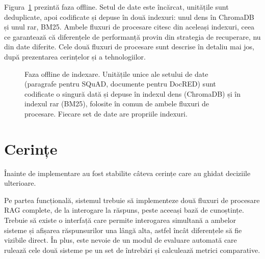 Figura~\ref{fig:offline} prezintă faza offline. Setul de date este încărcat, unitățile sunt deduplicate, apoi codificate și depuse în două indexuri: unul dens în ChromaDB și unul rar, BM25. Ambele fluxuri de procesare citesc din aceleași indexuri, ceea ce garantează că diferențele de performanță provin din strategia de recuperare, nu din date diferite. Cele două fluxuri de procesare sunt descrise în detaliu mai jos, după prezentarea cerințelor și a tehnologiilor.

\begin{figure}[ht]
\centering
{}
\caption{Faza offline de indexare. Unitățile unice ale setului de date (paragrafe pentru SQuAD, documente pentru DocRED) sunt codificate o singură dată și depuse în indexul dens (ChromaDB) și în indexul rar (BM25), folosite în comun de ambele fluxuri de procesare. Fiecare set de date are propriile indexuri.}
\label{fig:offline}
\end{figure}

\section{Cerințe}

Înainte de implementare au fost stabilite câteva cerințe care au ghidat deciziile ulterioare.

Pe partea funcțională, sistemul trebuie să implementeze două fluxuri de procesare RAG complete, de la interogare la răspuns, peste aceeași bază de cunoștințe. Trebuie să existe o interfață care permite interogarea simultană a ambelor sisteme și afișarea răspunsurilor una lângă alta, astfel încât diferențele să fie vizibile direct. În plus, este nevoie de un modul de evaluare automată care rulează cele două sisteme pe un set de întrebări și calculează metrici comparative.

